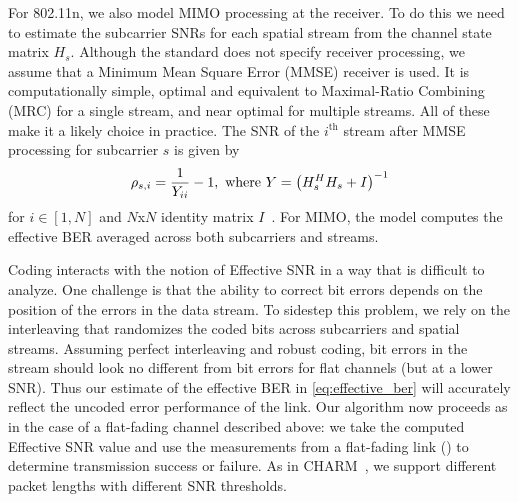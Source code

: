 For 802.11n, we also model MIMO processing at the receiver. To do this we need to estimate the subcarrier SNRs for each spatial stream from the channel state matrix $H_s$. Although the standard does not specify receiver processing, 
we assume that a Minimum Mean Square Error (MMSE) receiver is used. It is computationally simple, optimal and equivalent to Maximal-Ratio Combining (MRC) for a single stream, and near optimal for multiple streams. 
All of these make it a likely choice in practice.
The SNR of the $i^{\text{th}}$ stream after MMSE processing for subcarrier $s$ is 
given by
\begin{equation}
\centering
\label{eq:mmse_snr}
\rho_{s,i} = \frac{1}{Y_{ii}}-1, \text{ where }
Y = \left(H_s^H H_s+I\right)^{-1}
\end{equation}
for $i \in [1,N]$ and $N$x$N$ identity matrix $I$~\cite{Tse}. For MIMO, the model computes the effective BER averaged across both subcarriers and streams.

Coding interacts with the notion of Effective SNR in a way that is difficult to analyze. One challenge is that the ability to correct bit errors depends on the position of the errors in the data stream. To sidestep this problem, we rely on the interleaving that randomizes the coded bits across subcarriers and spatial streams. Assuming perfect interleaving and robust coding, bit errors in the stream should look no different from bit errors for flat channels (but at a lower SNR). Thus our estimate of the effective BER in \eqref{eq:effective_ber} will accurately reflect the uncoded error performance of the link. Our algorithm now proceeds as in the case of a flat-fading channel described above: we take the computed Effective SNR value and use the measurements from a flat-fading link () to determine transmission success or failure. As in CHARM~\cite{Judd_CHARM}, we support different packet lengths with different SNR thresholds.

